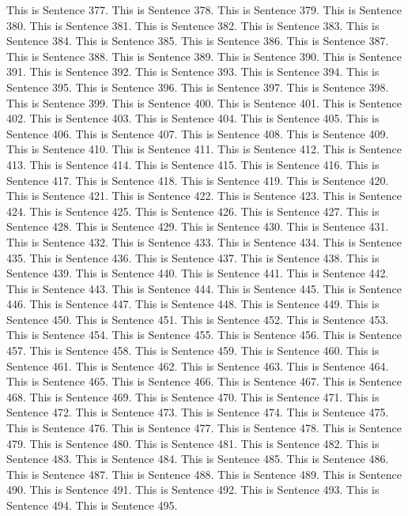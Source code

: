 \documentclass{article}
\begin{document}
This is Sentence 377.
This is Sentence 378.
This is Sentence 379.
This is Sentence 380.
This is Sentence 381.
This is Sentence 382.
This is Sentence 383.
This is Sentence 384.
This is Sentence 385.
This is Sentence 386.
This is Sentence 387.
This is Sentence 388.
This is Sentence 389.
This is Sentence 390.
This is Sentence 391.
This is Sentence 392.
This is Sentence 393.
This is Sentence 394.
This is Sentence 395.
This is Sentence 396.
This is Sentence 397.
This is Sentence 398.
This is Sentence 399.
This is Sentence 400.
This is Sentence 401.
This is Sentence 402.
This is Sentence 403.
This is Sentence 404.
This is Sentence 405.
This is Sentence 406.
This is Sentence 407.
This is Sentence 408.
This is Sentence 409.
This is Sentence 410.
This is Sentence 411.
This is Sentence 412.
This is Sentence 413.
This is Sentence 414.
This is Sentence 415.
This is Sentence 416.
This is Sentence 417.
This is Sentence 418.
This is Sentence 419.
This is Sentence 420.
This is Sentence 421.
This is Sentence 422.
This is Sentence 423.
This is Sentence 424.
This is Sentence 425.
This is Sentence 426.
This is Sentence 427.
This is Sentence 428.
This is Sentence 429.
This is Sentence 430.
This is Sentence 431.
This is Sentence 432.
This is Sentence 433.
This is Sentence 434.
This is Sentence 435.
This is Sentence 436.
This is Sentence 437.
This is Sentence 438.
This is Sentence 439.
This is Sentence 440.
This is Sentence 441.
This is Sentence 442.
This is Sentence 443.
This is Sentence 444.
This is Sentence 445.
This is Sentence 446.
This is Sentence 447.
This is Sentence 448.
This is Sentence 449.
This is Sentence 450.
This is Sentence 451.
This is Sentence 452.
This is Sentence 453.
This is Sentence 454.
This is Sentence 455.
This is Sentence 456.
This is Sentence 457.
This is Sentence 458.
This is Sentence 459.
This is Sentence 460.
This is Sentence 461.
This is Sentence 462.
This is Sentence 463.
This is Sentence 464.
This is Sentence 465.
This is Sentence 466.
This is Sentence 467.
This is Sentence 468.
This is Sentence 469.
This is Sentence 470.
This is Sentence 471.
This is Sentence 472.
This is Sentence 473.
This is Sentence 474.
This is Sentence 475.
This is Sentence 476.
This is Sentence 477.
This is Sentence 478.
This is Sentence 479.
This is Sentence 480.
This is Sentence 481.
This is Sentence 482.
This is Sentence 483.
This is Sentence 484.
This is Sentence 485.
This is Sentence 486.
This is Sentence 487.
This is Sentence 488.
This is Sentence 489.
This is Sentence 490.
This is Sentence 491.
This is Sentence 492.
This is Sentence 493.
This is Sentence 494.
This is Sentence 495.
\end{document}

